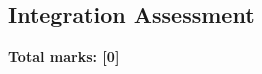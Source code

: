 \documentclass[../c1]{subfiles}
\begin{document}
\subsection*{Integration Assessment}
\thispagestyle{fancy}



\begin{flushright}
\textbf{Total marks: [0]}
\end{flushright}
\end{document}
